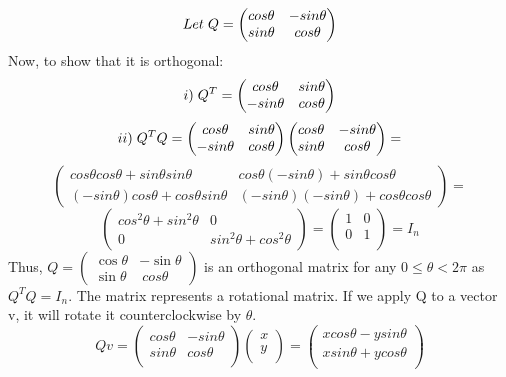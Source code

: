 \documentclass{article}
\begin{document}
\[
Let\hspace{0.1cm}Q =
\begin{pmatrix}
cos\theta & -sin\theta\\
sin\theta & cos\theta\\
\end{pmatrix}
\]
Now, to show that it is orthogonal:
\[
i)\hspace{0.1cm}Q^T =
\begin{pmatrix}
cos\theta & sin\theta\\
-sin\theta & cos\theta\\
\end{pmatrix}
\]
\[
ii)\hspace{0.1cm}Q^TQ =
\begin{pmatrix}
cos\theta & sin\theta\\
-sin\theta & cos\theta\\
\end{pmatrix}
\begin{pmatrix}
cos\theta & -sin\theta\\
sin\theta & cos\theta\\
\end{pmatrix} =
\]
\[
\begin{pmatrix}
cos\theta cos\theta + sin\theta sin\theta & cos\theta (-sin\theta) + sin\theta cos\theta \\
(-sin\theta) cos\theta + cos\theta sin\theta & (-sin\theta) (-sin\theta) + cos\theta cos\theta
\end{pmatrix} = 
\]
\[
\begin{pmatrix}
cos^2\theta + sin^2\theta & 0\\
0 & sin^2\theta + cos^2\theta
\end{pmatrix}
=
\begin{pmatrix}
1 & 0 \\
0 & 1 \\
\end{pmatrix}
=
I_n
\]
Thus, $Q = \begin{pmatrix} \cos \theta & - \sin \theta \\ \sin \theta & \
cos \theta \end{pmatrix}$ is an orthogonal matrix for any $0 \leq \theta < 2\pi$ as $Q^TQ = I_n$. The matrix represents a rotational matrix. If we apply Q to a vector v, it will rotate it  counterclockwise by $\theta$.\\
\[
Qv =
\begin{pmatrix}
cos\theta & -sin\theta\\
sin\theta & cos\theta\\
\end{pmatrix}
\begin{pmatrix}
x \\
y \\
\end{pmatrix}
=
\begin{pmatrix}
xcos\theta - ysin\theta\\
xsin\theta + ycos\theta\\
\end{pmatrix}
\]\\
\end{document}
